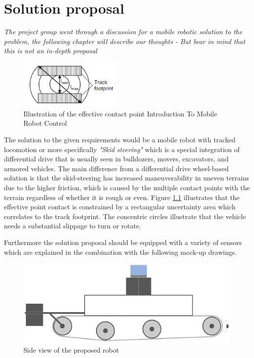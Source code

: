 \chapter{Solution proposal}

\textit{The project group went through a discussion for a mobile robotic solution to the problem, the following chapter will describe our thoughts - But bear in mind that this is not an in-depth proposal}

        \vspace{2mm}
        
\begin{figure}
    \centering
\includegraphics[width=0.45\textwidth]{00 - Images/track_footprint.PNG}
\caption{Illustration of the effective contact point Introduction To Mobile Robot Control \cite{Mobile_robot_control}}
\label{fig:point-of-contact-skid}
\end{figure}

The solution to the given requirements would be a mobile robot with tracked locomotion or more specifically \textit{"Skid steering"} which is a special integration of differential drive that is usually seen in bulldozers, movers, excavators, and armored vehicles. The main difference from a differential drive wheel-based solution is that the skid-steering has increased maneuverability in uneven terrains due to the higher friction, which is caused by the multiple contact points with the terrain regardless of whether it is rough or even. Figure \ref{fig:point-of-contact-skid} illustrates that the effective point contact is constrained by a rectangular uncertainty area which correlates to the track footprint. The concentric circles illustrate that the vehicle needs a substantial slippage to turn or rotate. \cite{Mobile_robot_control}

\vspace{2mm}
Furthermore the solution proposal should be equipped with a variety of sensors which are explained in the combination with the following mock-up drawings. 

\vspace{4mm}

\begin{figure}[!ht]
  \centering
  \includegraphics[width=\textwidth]{00 - Images/side_view_sp.jpeg}
  \caption{Side view of the proposed robot}
  \label{fig:side_view_sp,}
\end{figure}

